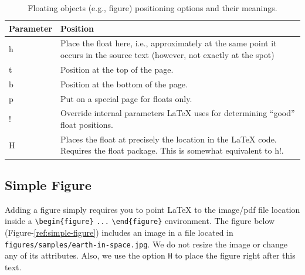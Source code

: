 \begin{table}[h!]
    \centering
    \begin{tabular}{p{}p{}}
        \hline\hline
        \textbf{Parameter} & \textbf{Position}                                                                                                            \\ \hline\hline
        h                  & Place the float here, i.e., approximately at the same point it occurs in the source text (however, not exactly at the spot)  \\ \hline
        t                  & Position at the top of the page.                                                                                             \\ \hline
        b                  & Position at the bottom of the page.                                                                                          \\ \hline
        p                  & Put on a special page for floats only.                                                                                       \\ \hline
        !                  & Override internal parameters {\LaTeX} uses for determining ``good'' float positions.                                            \\ \hline
        H                  & Places the float at precisely the location in the {\LaTeX} code. Requires the float package. This is somewhat equivalent to h!. \\ \hline\hline
    \end{tabular}
    \caption{Floating objects (e.g., figure) positioning options and their meanings.}
    \label{tab:position-options}
\end{table}


\subsection{Simple Figure}

Adding a figure simply requires you to point {\LaTeX} to the image/pdf file location inside a \verb|\begin{figure}| \verb|...| \verb|\end{figure}| environment. The figure below (Figure-\ref{ref:simple-figure}) includes an image in a file located in \verb|figures/samples/earth-in-space.jpg|. We do not resize the image or change any of its attributes. Also, we use the option \verb|H| to place the figure right after this text.


